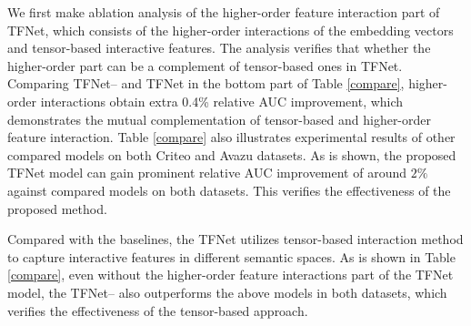 \documentclass[sigconf]{acmart}
\begin{document}

\noindent We first make ablation analysis of the higher-order feature interaction part of TFNet, which consists of the higher-order interactions of the embedding vectors and tensor-based interactive features. The analysis verifies that whether the higher-order part can be a complement of tensor-based ones in TFNet. Comparing TFNet-- and TFNet in the bottom part of Table \ref{compare}, higher-order interactions obtain extra 0.4\% relative AUC improvement, which demonstrates the mutual complementation of tensor-based and higher-order feature interaction. 
Table \ref{compare} also illustrates experimental results of other compared models on both Criteo and Avazu datasets. As is shown, the proposed TFNet model can gain prominent relative AUC improvement of around $2\%$ against compared models on both datasets. This verifies the effectiveness of the proposed method.

Compared with the baselines, the TFNet utilizes tensor-based interaction method to capture interactive features in different semantic spaces. As is shown in Table \ref{compare}, even without the higher-order feature interactions part of the TFNet model, the TFNet-- also outperforms the above models in both datasets, which verifies the effectiveness of the tensor-based approach.
\end{document}
